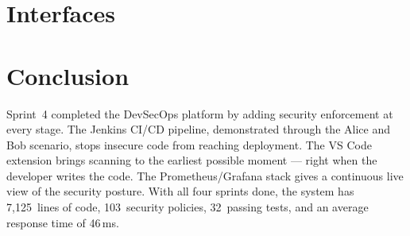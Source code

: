\section{Interfaces}



\section{Conclusion}

Sprint~4 completed the DevSecOps platform by adding security enforcement at every stage. The Jenkins CI/CD pipeline, demonstrated through the Alice and Bob scenario, stops insecure code from reaching deployment. The VS Code extension brings scanning to the earliest possible moment --- right when the developer writes the code. The Prometheus/Grafana stack gives a continuous live view of the security posture. With all four sprints done, the system has 7{,}125~lines of code, 103~security policies, 32~passing tests, and an average response time of 46\,ms.
